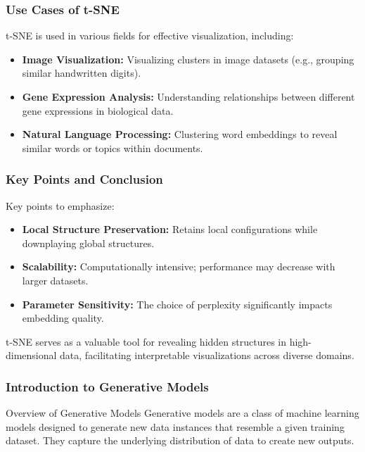 \documentclass[aspectratio=169]{beamer}
\begin{document}
\begin{frame}[fragile]
    \frametitle{Use Cases of t-SNE}
    t-SNE is used in various fields for effective visualization, including:

    \begin{itemize}
        \item \textbf{Image Visualization:} Visualizing clusters in image datasets (e.g., grouping similar handwritten digits).
        \item \textbf{Gene Expression Analysis:} Understanding relationships between different gene expressions in biological data.
        \item \textbf{Natural Language Processing:} Clustering word embeddings to reveal similar words or topics within documents.
    \end{itemize}
\end{frame}

\begin{frame}[fragile]
    \frametitle{Key Points and Conclusion}
    Key points to emphasize:
    \begin{itemize}
        \item \textbf{Local Structure Preservation:} Retains local configurations while downplaying global structures.
        \item \textbf{Scalability:} Computationally intensive; performance may decrease with larger datasets.
        \item \textbf{Parameter Sensitivity:} The choice of perplexity significantly impacts embedding quality.
    \end{itemize}

    t-SNE serves as a valuable tool for revealing hidden structures in high-dimensional data, facilitating interpretable visualizations across diverse domains.
\end{frame}

\begin{frame}[fragile]
    \frametitle{Introduction to Generative Models}
    \begin{block}{Overview of Generative Models}
        Generative models are a class of machine learning models designed to generate new data instances that resemble a given training dataset. They capture the underlying distribution of data to create new outputs.
    \end{block}
\end{frame}
\end{document}
